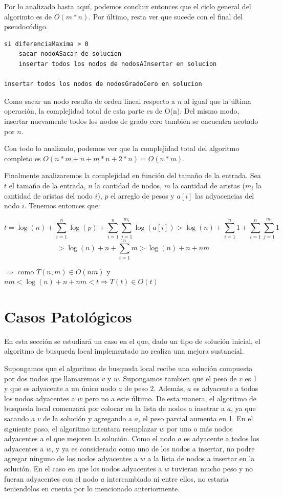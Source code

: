 \documentclass[a4paper,11pt] {article}
\begin{document}
Por lo analizado hasta aquí, podemos concluir entonces que el ciclo general del algorimto es de $O(m*n)$. Por último, resta ver que sucede con el final del pseudocódigo.

\begin{verbatim}
si diferenciaMaxima > 0
    sacar nodoASacar de solucion
    insertar todos los nodos de nodosAInsertar en solucion

insertar todos los nodos de nodosGradoCero en solucion
\end{verbatim}

Como sacar un nodo resulta de orden lineal respecto a $n$ al igual que la última operación, la complejidad total de esta parte es de O(n). Del mismo modo, insertar nuevamente todos los nodos de grado cero también se encuentra acotado por $n$.

Con todo lo analizado, podemos ver que la complejidad total del algoritmo completo es $O(n*m + n + m*n + 2*n) = O(n*m)$.

Finalmente analizaremos la complejidad en funci\'on del tama\~{n}o de la entrada. Sea $t$ el tama\~{n}o de la entrada, $n$ la cantidad de nodos, $m$ la cantidad de aristas ($m_i$ la cantidad de aristas del nodo $i$), $p$ el arreglo de pesos y $a[i]$ las adyacencias del nodo $i$. Tenemos entonces que:

$$t=\log(n)+\sum_{i=1}^{n}\log(p)+\sum_{i=1}^{n}\sum_{j=1}^{m_i}\log(a[i])>\log(n)+\sum_{i=1}^{n}1+\sum_{i=1}^{n}\sum_{j=1}^{m_i}1$$
$$>\log(n)+n+\sum_{i=1}^{n}m>\log(n)+n+nm$$

\hspace{20pt} $\Longrightarrow$ como $T(n,m) \in O(nm)$ y $nm<\log(n)+n+nm<t \Longrightarrow T(t) \in O(t)$

\section*{Casos Patol\'ogicos}

En esta secci\'on se estudiar\'a un caso en el que, dado un tipo de soluci\'on inicial, el algoritmo de busqueda local implementado no realiza una mejora sustancial.

Supongamos que el algoritmo de busqueda local recibe una soluci\'on compuesta por dos nodos que llamaremos $v$ y $w$. Supongamos tambien que el peso de $v$ es 1 y que es adyacente a un \'unico nodo $a$ de peso 2. Adem\'as, $a$ es adyacente a todos los nodos adyacentes a $w$ pero no a este \'ultimo. De esta manera, el algoritmo de busqueda local comenzar\'a por colocar en la lista de nodos a insetrar a $a$, ya que sacando a $v$ de la soluci\'on y agregando a $a$, el peso parcial aumenta en 1. En el siguiente paso, el algoritmo intentara reemplazar $w$ por uno o m\'as nodos adyacentes a el que mejoren la soluci\'on. Como el nodo $a$ es adyacente a todos los adyacentes a $w$, y ya es considerado como uno de los nodos a insertar, no podre agregar ninguno de los nodos adyacentes a $w$ a la lista de nodos a insertar en la soluci\'on. En el caso en que los nodos adyacentes a $w$ tuvieran mucho peso y no fueran adyacentes con el nodo $a$ intercambiado ni entre ellos, no estaria teniendolos en cuenta por lo mencionado anteriormente.
\end{document}
